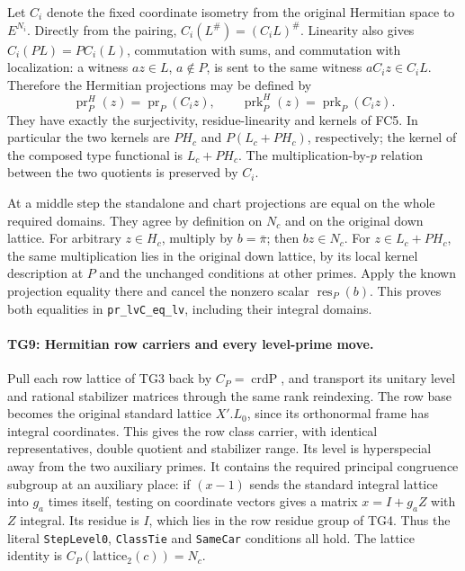 Let $C_i$ denote the fixed coordinate isometry from the original
Hermitian space to $E^{N_i}$. Directly from the pairing,
$C_i(L^{\#})=(C_iL)^{\#}$. Linearity also gives
$C_i(P L)=P C_i(L)$, commutation with sums, and commutation with
localization: a witness $az\in L$, $a\notin P$, is sent to the
same witness $aC_i z\in C_iL$. Therefore the Hermitian
projections may be defined by
\[
 \operatorname{pr}^{H}_P(z)=\operatorname{pr}_P(C_i z),
 \qquad
 \operatorname{prk}^{H}_P(z)=\operatorname{prk}_P(C_i z).
 \tag{TG.20}
\]
They have exactly the surjectivity, residue-linearity and kernels
of FC5. In particular the two kernels are $PH_c$ and
$P(L_c+PH_c)$, respectively; the kernel of the composed type
functional is $L_c+PH_c$. The multiplication-by-$p$ relation
between the two quotients is preserved by $C_i$.

At a middle step the standalone and chart projections are equal
on the whole required domains. They agree by definition on
$N_c$ and on the original down lattice. For arbitrary
$z\in H_c$, multiply by $b=\bar\pi$; then $bz\in N_c$.
For $z\in L_c+PH_c$, the same multiplication lies in the
original down lattice, by its local kernel description at $P$
and the unchanged conditions at other primes. Apply the known
projection equality there and cancel the nonzero scalar
$\operatorname{res}_P(b)$. This proves both equalities in
\texttt{pr\_lvC\_eq\_lv}, including their integral domains.

\paragraph{TG9: Hermitian row carriers and every level-prime move.}
Pull each row lattice of TG3 back by $C_P=\operatorname{crdP}$,
and transport its unitary level and rational stabilizer matrices
through the same rank reindexing. The row base becomes the
original standard lattice $X'.L_0$, since its orthonormal frame
has integral coordinates. This gives the row class carrier,
with identical representatives, double quotient and stabilizer
range. Its level is hyperspecial away from the two auxiliary
primes. It contains the required principal congruence subgroup
at an auxiliary place: if $(x-1)$ sends the standard integral
lattice into $g_a$ times itself, testing on coordinate vectors
gives a matrix $x=I+g_a Z$ with $Z$ integral. Its residue is
$I$, which lies in the row residue group of TG4. Thus the
literal \texttt{StepLevel0}, \texttt{ClassTie} and
\texttt{SameCar} conditions all hold. The lattice identity is
$C_P(\mathrm{lattice}_2(c))=N_c$.

